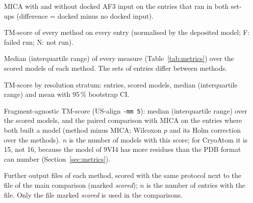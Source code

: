 \begin{table}[tbp]
\centering\small
\caption{MICA with and without docked AF3 input on the entries that ran in both set-ups (difference = docked minus no docked input).}
\label{tab:dockeffect}
\fitwidth{}
\end{table}

\begin{table}[tbp]
\centering\small
\caption{TM-score of every method on every entry (normalised by the deposited model; F: failed run; N: not run).}
\label{tab:perentry}
\fitwidth{}
\end{table}

\begin{table}[tbp]
\centering\small
\caption{Median (interquartile range) of every measure (Table~\ref{tab:metrics}) over the scored models of each method. The sets of entries differ between methods.}
\label{tab:allmetrics}
\fitwidth{}
\end{table}

\begin{table}[tbp]
\centering\small
\caption{TM-score by resolution stratum: entries, scored models, median (interquartile range) and mean with 95\,\% bootstrap CI.}
\label{tab:strata}
\fitwidth{}
\end{table}

\begin{table}[tbp]
\centering\small
\caption{Fragment-agnostic TM-score (US-align \texttt{-mm 5}): median (interquartile range) over the scored models, and the paired comparison with MICA on the entries where both built a model (method minus MICA; Wilcoxon $p$ and its Holm correction over the \NFamilyWord{} methods). $n$ is the number of models with this score; for CryoAtom it is 15, not 16, because the model of 9VI4 has more residues than the PDB format can number (Section~\ref{sec:metrics}).}
\label{tab:fns}
\fitwidth{}
\end{table}

\begin{table}[tbp]
\centering\small
\caption{Further output files of each method, scored with the same protocol next to the file of the main comparison (marked \emph{scored}); $n$ is the number of entries with the file. Only the file marked \emph{scored} is used in the comparisons.}
\label{tab:variants}
\fitwidth{}
\end{table}

